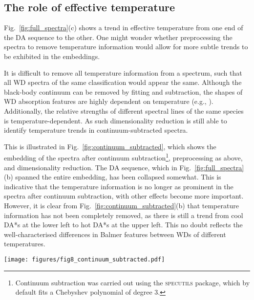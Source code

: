 \documentclass[fleqn,usenatbib]{mnras}
\def\Teff{T_\mathrm{eff}}
\begin{document}
\subsection{The role of effective temperature}
\label{sec:discteff}

Fig.~\ref{fig:full_spectra}(c) shows a trend in effective temperature from one end of the DA sequence to the other.
One might wonder whether preprocessing the spectra to remove temperature information would allow for more subtle trends to be exhibited in the embeddings.

It is difficult to remove all temperature information from a spectrum, such that all WD spectra of the same classification would appear the same.
Although the black-body continuum can be removed by fitting and subtraction, the shapes of WD absorption features are highly dependent on temperature (e.g., \citealt{liebert05, tremblay09}).
Additionally, the relative strengths of different spectral lines of the same species is temperature-dependent.
As such dimensionality reduction is still able to identify temperature trends in continuum-subtracted spectra.

This is illustrated in Fig.~\ref{fig:continuum_subtracted}, which shows the embedding of the spectra after continuum subtraction\footnote{
    Continuum subtraction was carried out using the \textsc{specutils} package, which by default fits a Chebyshev polynomial of degree 3.
}, preprocessing as above, and dimensionality reduction.
The DA sequence, which in Fig.~\ref{fig:full_spectra}(b) spanned the entire embedding, has been collapsed somewhat.
This is indicative that the temperature information is no longer as prominent in the spectra after continuum subtraction, with other effects become more important.
However, it is clear from Fig.~\ref{fig:continuum_subtracted}(b) that temperature information has not been completely removed, as there is still a trend from cool DA*s at the lower left to hot DA*s at the upper left.
This no doubt reflects the well-characterised differences in Balmer features between WDs of different temperatures.

\begin{figure*}
\texttt{[image: figures/fig8\_continuum\_subtracted.pdf]}
\caption{
    Dimensionality-reduced embedding of spectra following continuum subtraction.
    (a) Colour-coded according to the visual classification of \citet{manser24}, as in Fig.~\ref{fig:full_spectra}(b).
    The DA sequence has partially collapsed, but not entirely.
    (b) Colour-coded according to $\Teff$, as in Fig.~\ref{fig:full_spectra}(c).
    There is still a temperature trend along the shorter DA sequence.
}
\label{fig:continuum_subtracted}
\end{figure*}
\end{document}
